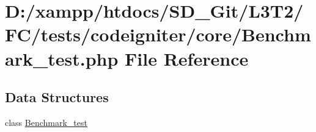 \hypertarget{tests_2codeigniter_2core_2_benchmark__test_8php}{}\section{D\+:/xampp/htdocs/\+S\+D\+\_\+\+Git/\+L3\+T2/\+F\+C/tests/codeigniter/core/\+Benchmark\+\_\+test.php File Reference}
\label{tests_2codeigniter_2core_2_benchmark__test_8php}
\subsection*{Data Structures}
\begin{DoxyCompactItemize}
\item 
class \hyperlink{class_benchmark__test}{Benchmark\+\_\+test}
\end{DoxyCompactItemize}
